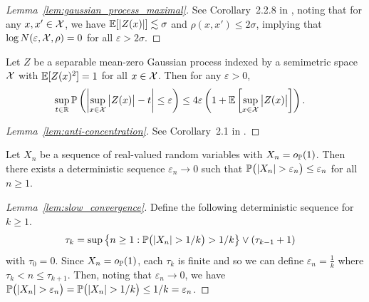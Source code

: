 \begin{proof}[Lemma~\ref{lem:gaussian_process_maximal}]

  See Corollary~2.2.8 in \citet{van1996weak},
  noting that for any $x,x' \in \cX$, we have
  $\E[|Z(x)|] \lesssim \sigma$ and
  $\rho(x,x') \leq 2\sigma$,
  implying that
  $\log N(\varepsilon, \cX, \rho) = 0$
  for all
  $\varepsilon > 2 \sigma$.
\end{proof}

\begin{lemma}
  \label{lem:anti-concentration}

  Let $Z$ be a separable mean-zero Gaussian process
  indexed by a semimetric space $\cX$ with
  $\E[Z(x)^2] = 1$
  for all $x \in \cX$.
  Then for any $\varepsilon > 0$,
  \begin{align*}
    \sup_{t \in \R}
    \P\left(
      \left|
      \sup_{x \in \cX}
      \big| Z(x) \big|
      - t
      \right|
      \leq \varepsilon
    \right)
    &\leq
    4 \varepsilon
    \left(
      1 + \E\left[
        \sup_{x \in \cX}
        \big| Z(x) \big|
      \right]
    \right).
  \end{align*}

\end{lemma}

\begin{proof}[Lemma~\ref{lem:anti-concentration}]

  See Corollary~2.1
  in \citet{chernozhukov2014anti}.
\end{proof}

\begin{lemma}
  \label{lem:slow_convergence}

  Let $X_n$ be a sequence of real-valued random
  variables with
  $X_n = o_\P(1)$.
  Then there exists a deterministic sequence
  $\varepsilon_n \to 0$
  such that
  $\P\big(|X_n| > \varepsilon_n\big) \leq \varepsilon_n$
  for all $n \geq 1$.

\end{lemma}

\begin{proof}[Lemma~\ref{lem:slow_convergence}]

  Define the following deterministic sequence
  for $k \geq 1$.
  \begin{align*}
    \tau_k
    &=
    \sup
    \big\{
      n \geq 1:
      \P\big(|X_n| > 1/k\big)
      > 1/k
    \big\}
    \vee
    (\tau_{k-1} +1)
  \end{align*}
  with $\tau_0 = 0$.
  Since $X_n = o_\P(1)$,
  each $\tau_k$ is finite
  and so we can define
  $\varepsilon_n = \frac{1}{k}$
  where $\tau_k < n \leq \tau_{k+1}$.
  Then, noting that $\varepsilon_n \to 0$,
  we have
  $\P\big(|X_n| > \varepsilon_n\big)
  = \P\big(|X_n| > 1/k\big) \leq 1/k = \varepsilon_n$.
\end{proof}

